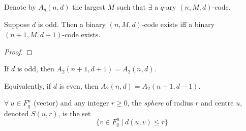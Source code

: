 \documentclass{article}
\theoremstyle{definition}
\newenvironment{defn}[1]
{\renewcommand\theinnerdefn{#1}\innerdefn}
{\endinnerdefn}
\newenvironment{thm}[1]
{\renewcommand\theinnerthm{#1}\innerthm}
{\endinnerthm}
\newenvironment{cor}[1]
{\renewcommand\theinnercor{#1}\innercor}
{\endinnercor}
\begin{document}
Denote by $A_q(n, d)$ the largest $M$ such that $\exists$ a $q$-ary $(n, M, d)$-code.

\begin{thm}{2.7}
  Suppose $d$ is odd. Then a binary $(n, M, d)$-code exists iff a binary $(n + 1, M, d + 1)$-code exists.
\end{thm}
\begin{proof}
\end{proof}

\begin{cor}{2.8}
  If $d$ is odd, then $A_2(n+1, d+1)=A_2(n, d)$.

  Equivalently, if $d$ is even, then $A_2(n, d) = A_2(n-1,d-1)$.
\end{cor}



\begin{defn}{}[Sphere]
  $\forall~ u \in F_q^n$ (vector) and any integer $r \geq 0$, the \emph{sphere} of radius $r$ and centre $u$, denoted $S(u, r)$, is the set
  $$\{ v \in F_q^n ~|~ d(u, v) \leq r \}$$
\end{defn}
\end{document}
